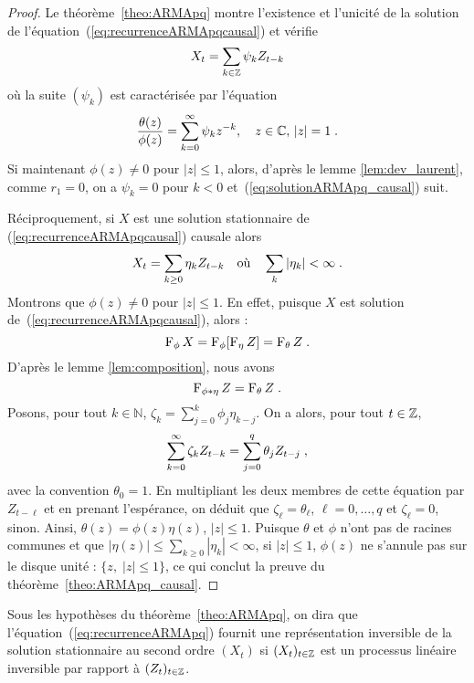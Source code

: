 \begin{proof}
Le th\'eor\`eme~\ref{theo:ARMApq} montre l'existence et l'unicit\'e
de la solution de l'\'equation~(\ref{eq:recurrenceARMApqcausal}) et v\'erifie
\begin{equation*}
  X_t = \sum_{k\in\mathbb{Z}} \psi_k Z_{t-k}
\end{equation*}
o\`u la suite $(\psi_k)$ est caract\'eris\'ee par l'\'equation
$$
\frac{\theta(z)}{\phi(z)}=\sum_{k=0}^{\infty} \psi_k z^{-k},\quad z\in\mathbb{C},\,|z|=1\;.
$$
Si maintenant $\phi(z)\neq 0$ pour $|z|\leq 1$, alors, d'apr\`es le
 lemme \ref{lem:dev_laurent}, comme $r_1=0$, on a $\psi_k=0$ pour $k<0$
 et~(\ref{eq:solutionARMApq_causal}) suit.


R\'eciproquement, si $X$ est une solution stationnaire de
(\ref{eq:recurrenceARMApqcausal}) causale alors  
$$
X_t=\sum_{k\geq 0}\eta_k Z_{t-k} \quad  \text{o\`u}  \quad \sum_k |\eta_k|<\infty \;.
$$
Montrons que $\phi(z)\neq 0$ pour $|z|\leq 1$. En effet, puisque $X$ est solution
de~(\ref{eq:recurrenceARMApqcausal}), alors : 
$$
\operatorname{F}_{\phi} X=\operatorname{F}_{\phi}[\operatorname{F}_{\eta} Z]=\operatorname{F}_{\theta} Z \;.
$$ 
D'apr\`es le lemme \ref{lem:composition}, nous avons  
$$
\operatorname{F}_{\phi * \eta}Z=\operatorname{F}_{\theta} Z \;. 
$$
Posons, pour
tout $k\in\mathbb{N}$, $\zeta_k=\sum_{j=0}^k \phi_j \eta_{k-j}$. On a alors, pour tout $t\in\mathbb{Z}$,
$$
\sum_{k= 0}^\infty \zeta_k Z_{t-k}=\sum_{j=0}^q\theta_j Z_{t-j} \;,
$$ 
avec la convention $\theta_0=1$.  En multipliant les deux membres de cette \'equation par
$Z_{t-\ell}$ et en prenant l'esp\'erance, on d\'eduit que $\zeta_\ell=\theta_\ell$,
$\ell=0,\dots,q$ et $\zeta_\ell=0$, sinon. Ainsi, $\theta(z)=\phi(z)\eta(z)$,
$|z|\leq 1$. Puisque $\theta$ et $\phi$ n'ont pas de racines communes et que
$|\eta(z)|\leq\sum_{k\geq 0}|\eta_k|<\infty$, si $|z|\leq 1$, $\phi(z)$ ne
s'annule pas sur le disque unit\'e : $\{z,\; |z|\leq 1\}$, ce qui conclut la
preuve du th\'eor\`eme~\ref{theo:ARMApq_causal}.

\end{proof}


\begin{definition}
  Sous les hypoth\`eses du th\'eor\`eme~\ref{theo:ARMApq}, on dira que
  l'\'equation~(\ref{eq:recurrenceARMApq}) fournit une repr\'esentation inversible
  de la solution stationnaire au second ordre $(X_t)$ si $(X_t)_{t\in\mathbb{Z}}$
  est un processus lin\'eaire inversible par rapport \`a $(Z_t)_{t\in\mathbb{Z}}$.
\end{definition}

